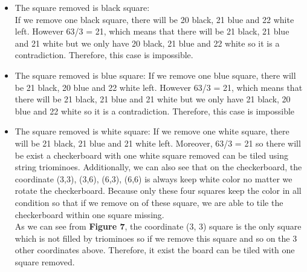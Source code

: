\documentclass{article}
\begin{document}
\begin{itemize}
    \item The square removed is black square:\\ 
    If we remove one black square, there will be 20 black, 21 blue and 22 white left.
    However 63/3 = 21, which means that there will be 21 black, 21 blue and 21 white 
    but we only have 20 black, 21 blue and 22 white so it is a contradiction.
    Therefore, this case is impossible.
    \item The square removed is blue square:
    If we remove one blue square, there will be 21 black, 20 blue and 22 white left.
    However 63/3 = 21, which means that there will be 21 black, 21 blue and 21 white 
    but we only have 21 black, 20 blue and 22 white so it is a contradiction.
    Therefore, this case is impossible
    \item The square removed is white square:
    If we remove one white square, there will be 21 black, 21 blue and 21 white left.
    Moreover, 63/3 = 21 so there will be exist a checkerboard with one white square
    removed can be tiled using string triominoes. Additionally, we can also see that
    on the checkerboard, the coordinate (3,3), (3,6), (6,3), (6,6) is always keep
    white color no matter we rotate the checkerboard. Because only these four squares
    keep the color in all condition so that if we remove on of these square, we are able
    to tile the checkerboard within one square missing.\\

    As we can see from \textbf{Figure 7}, the coordinate (3, 3) square is the only
    square which is not filled by triominoes so if we remove this square and so on the 3 other
    coordinates above. Therefore, it exist the board can be tiled with one square removed.
\end{itemize}
\end{document}

